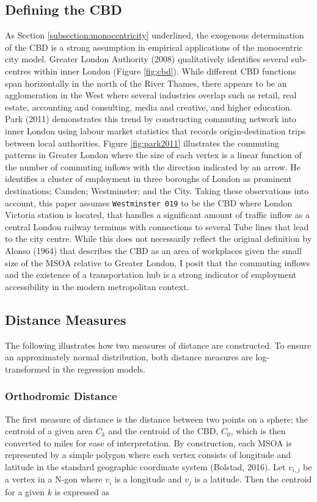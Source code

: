 \documentclass{article}
\begin{document}
\subsection{Defining the CBD}\label{subsection:CBD}
As Section \ref{subsection:monocentricity} underlined, the exogenous determination of the CBD is a strong assumption in empirical applications of the monocentric city model.  Greater London Authority (2008) qualitatively identifies several sub-centres within inner London (Figure \ref{fig:cbd}). While different CBD functions span horizontally in the north of the River Thames, there appears to be an agglomeration in the West where several industries overlap such as retail, real estate, accounting and consulting, media and creative, and higher education. Park (2011) demonstrates this trend by constructing commuting network into inner London using labour market statistics that records origin-destination trips between local authorities. Figure \ref{fig:park2011} illustrates the commuting patterns in Greater London where the size of each vertex is a linear function of the number of commuting inflows with the direction indicated by an arrow. He identifies a cluster of employment in three boroughs of London as prominent destinations; Camden; Westminster; and the City. Taking these observations into account, this paper assumes  \texttt{Westminster 019}  to be the CBD where London Victoria station is located, that handles a significant amount of traffic inflow as a central London railway terminus with connections to several Tube lines that lead to the city centre. While this does not necessarily reflect the original definition by Alonso (1964) that describes the CBD as an area of workplaces given the small size of the MSOA relative to Greater London, I posit that the commuting inflows and the existence of a transportation hub is a strong indicator of employment accessibility in the modern metropolitan context.

\subsection{Distance Measures}
The following illustrates how two measures of distance are constructed. To ensure an approximately normal distribution, both distance measures are log-transformed in the regression models.
\subsubsection{Orthodromic Distance}
The first measure of distance is the distance between two points on a sphere; the centroid of a given area $C_k$ and the centroid of the CBD, $C_0$, which is then converted to miles for ease of interpretation. By construction, each MSOA is represented by a simple polygon where each vertex consists of longitude and latitude in the standard geographic coordinate system (Bolstad, 2016). Let $v_{i,j}$ be a vertex in a N-gon where $v_i$ is a longitude and $v_j$ is a latitude. Then the centroid for a given $k$ is expressed as 
\end{document}
